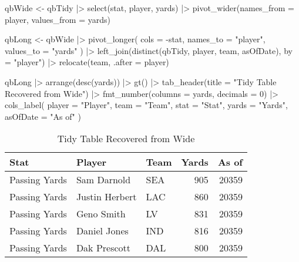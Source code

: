 \documentclass[
  letterpaper,
  DIV=11,
  numbers=noendperiod]{scrartcl}
\newenvironment{Shaded}{\begin{snugshade}}{\end{snugshade}}
\newcommand{\AttributeTok}[1]{\textcolor[rgb]{0.40,0.45,0.13}{#1}}
\newcommand{\DecValTok}[1]{\textcolor[rgb]{0.68,0.00,0.00}{#1}}
\newcommand{\FunctionTok}[1]{\textcolor[rgb]{0.28,0.35,0.67}{#1}}
\newcommand{\NormalTok}[1]{\textcolor[rgb]{0.00,0.23,0.31}{#1}}
\newcommand{\OtherTok}[1]{\textcolor[rgb]{0.00,0.23,0.31}{#1}}
\newcommand{\SpecialCharTok}[1]{\textcolor[rgb]{0.37,0.37,0.37}{#1}}
\newcommand{\StringTok}[1]{\textcolor[rgb]{0.13,0.47,0.30}{#1}}
\begin{document}
\begin{Shaded}
\begin{Highlighting}[]
\NormalTok{qbWide }\OtherTok{\textless{}{-}}\NormalTok{ qbTidy }\SpecialCharTok{|\textgreater{}}
  \FunctionTok{select}\NormalTok{(stat, player, yards) }\SpecialCharTok{|\textgreater{}}
  \FunctionTok{pivot\_wider}\NormalTok{(}\AttributeTok{names\_from =}\NormalTok{ player, }\AttributeTok{values\_from =}\NormalTok{ yards)}

\NormalTok{qbLong }\OtherTok{\textless{}{-}}\NormalTok{ qbWide }\SpecialCharTok{|\textgreater{}}
  \FunctionTok{pivot\_longer}\NormalTok{(}
    \AttributeTok{cols =} \SpecialCharTok{{-}}\NormalTok{stat,}
    \AttributeTok{names\_to =} \StringTok{"player"}\NormalTok{,}
    \AttributeTok{values\_to =} \StringTok{"yards"}
\NormalTok{  ) }\SpecialCharTok{|\textgreater{}}
  \FunctionTok{left\_join}\NormalTok{(}\FunctionTok{distinct}\NormalTok{(qbTidy, player, team, asOfDate), }\AttributeTok{by =} \StringTok{"player"}\NormalTok{) }\SpecialCharTok{|\textgreater{}}
  \FunctionTok{relocate}\NormalTok{(team, }\AttributeTok{.after =}\NormalTok{ player)}

\NormalTok{qbLong }\SpecialCharTok{|\textgreater{}}
  \FunctionTok{arrange}\NormalTok{(}\FunctionTok{desc}\NormalTok{(yards)) }\SpecialCharTok{|\textgreater{}}
  \FunctionTok{gt}\NormalTok{() }\SpecialCharTok{|\textgreater{}}
  \FunctionTok{tab\_header}\NormalTok{(}\AttributeTok{title =} \StringTok{"Tidy Table Recovered from Wide"}\NormalTok{) }\SpecialCharTok{|\textgreater{}}
  \FunctionTok{fmt\_number}\NormalTok{(}\AttributeTok{columns =}\NormalTok{ yards, }\AttributeTok{decimals =} \DecValTok{0}\NormalTok{) }\SpecialCharTok{|\textgreater{}}
  \FunctionTok{cols\_label}\NormalTok{(}
    \AttributeTok{player =} \StringTok{"Player"}\NormalTok{,}
    \AttributeTok{team =} \StringTok{"Team"}\NormalTok{,}
    \AttributeTok{stat =} \StringTok{"Stat"}\NormalTok{,}
    \AttributeTok{yards =} \StringTok{"Yards"}\NormalTok{,}
    \AttributeTok{asOfDate =} \StringTok{"As of"}
\NormalTok{  )}
\end{Highlighting}
\end{Shaded}

\begin{table}
\caption*{
{\fontsize{20}{25}\selectfont  Tidy Table Recovered from Wide\fontsize{12}{15}\selectfont }
} 
\fontsize{12.0pt}{14.0pt}\selectfont
\begin{tabular*}{\linewidth}{@{\extracolsep{\fill}}lllrr}
\toprule
Stat & Player & Team & Yards & As of \\ 
\midrule\addlinespace[2.5pt]
Passing Yards & Sam Darnold & SEA & 905 & 20359 \\ 
Passing Yards & Justin Herbert & LAC & 860 & 20359 \\ 
Passing Yards & Geno Smith & LV & 831 & 20359 \\ 
Passing Yards & Daniel Jones & IND & 816 & 20359 \\ 
Passing Yards & Dak Prescott & DAL & 800 & 20359 \\ 
\bottomrule
\end{tabular*}
\end{table}
\end{document}
